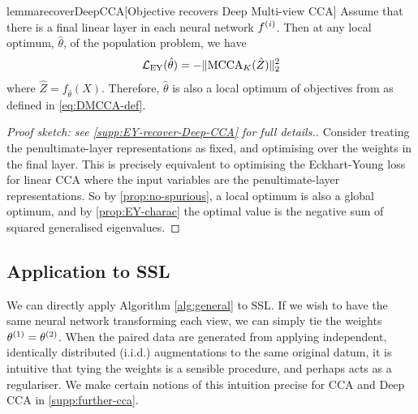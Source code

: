 \begin{restatable}{lemma}{recoverDeepCCA}[Objective recovers Deep Multi-view CCA]\label{lem:recover-DeepCCA}
    Assume that there is a final linear layer in each neural network $f^{(i)}$.
    Then at any local optimum, $\hat{\theta}$, of the population problem, we have
    \begin{align*}
        \mathcal{L}_\text{EY}(\hat{\theta}) = - \lVert\operatorname{MCCA}_K(\hat{Z})\rVert_2^2
    \end{align*}
    where $\hat{Z} = f_{\hat{\theta}}(X)$.
    Therefore, $\hat{\theta}$ is also a local optimum of objectives from \cite{andrew2013deep, somandepalli2019multimodal} as defined in \cref{eq:DMCCA-def}.
\end{restatable}
\begin{proof}[Proof sketch: see \cref{supp:EY-recover-Deep-CCA} for full details.]
    Consider treating the penultimate-layer representations as fixed, and optimising over the weights in the final layer. This is precisely equivalent to optimising the Eckhart-Young loss for linear CCA where the input variables are the penultimate-layer representations. So by \cref{prop:no-spurious}, a local optimum is also a global optimum, and by \cref{prop:EY-charac} the optimal value is the negative sum of squared generalised eigenvalues.
\end{proof}

\subsection{Application to SSL}
We can directly apply Algorithm \ref{alg:general} to SSL.
If we wish to have the same neural network transforming each view, we can simply tie the weights $\theta^{(1)} = \theta^{(2)}$.
When the paired data are generated from applying independent, identically distributed (i.i.d.) augmentations to the same original datum, it is intuitive that tying the weights is a sensible procedure, and perhaps acts as a regulariser.
We make certain notions of this intuition precise for CCA and Deep CCA in \cref{supp:further-cca}.


